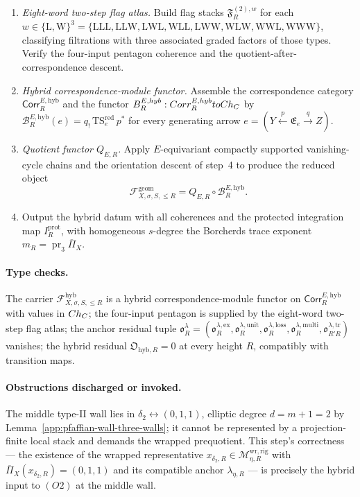 \begin{enumerate}
\item \emph{Eight-word two-step flag atlas.}  Build flag stacks
\(\mathfrak F^{(2),w}_R\) for each
\(w\in\{\mathrm L,\mathrm W\}^3=
\{\mathrm{LLL},\mathrm{LLW},\mathrm{LWL},\mathrm{WLL},\mathrm{LWW},
\mathrm{WLW},\mathrm{WWL},\mathrm{WWW}\}\), classifying filtrations
with three associated graded factors of those types.  Verify the
four-input pentagon coherence and the quotient-after-correspondence
descent.

\item \emph{Hybrid correspondence-module functor.}  Assemble the
correspondence category
\(\mathsf{Corr}^{E,\mathrm{hyb}}_R\) and the functor
\(B_R^{E,hyb}:Corr^{E,hyb}_R
toCh_{C}\) by
\(\mathcal B_R^{E,\mathrm{hyb}}(e)=q_!\,\mathrm{TS}^{\mathrm{red}}_e\,p^*\)
for every generating arrow
\(e=(Y\xleftarrow{p}\mathfrak E_e\xrightarrow{q}Z)\).

\item \emph{Quotient functor \(Q_{E,R}\).}  Apply
\(E\)-equivariant compactly supported vanishing-cycle chains and the
orientation descent of step~4 to produce the reduced object
\[
\mathcal F^{\mathrm{geom}}_{X,\sigma,S,\le R}
=Q_{E,R}\circ\mathcal B_R^{E,\mathrm{hyb}}.
\]

\item Output the hybrid datum with all coherences and the protected
integration map \(I_R^{\mathrm{prot}}\), with homogeneous
\(s\)-degree the Borcherds trace exponent
\(m_R=\operatorname{pr}_3\overline\Pi_X\).
\end{enumerate}

\paragraph{Type checks.}
The carrier
\(\mathcal F_{X,\sigma,S,\le R}^{\mathrm{hyb}}\) is a hybrid
correspondence-module functor on
\(\mathsf{Corr}^{E,\mathrm{hyb}}_R\) with values in
\(Ch_{C}\); the four-input pentagon is supplied by
the eight-word two-step flag atlas; the anchor residual tuple
\(\mathfrak o^\lambda_R=
(\mathfrak o^{\lambda,\mathrm{ex}}_R,
\mathfrak o^{\lambda,\mathrm{unit}}_R,
\mathfrak o^{\lambda,\mathrm{loss}}_R,
\mathfrak o^{\lambda,\mathrm{multi}}_R,
\mathfrak o^{\lambda,\mathrm{tr}}_{R'R})\) vanishes; the hybrid
residual \(\mathfrak O_{\mathrm{hyb},R}=0\) at every height \(R\),
compatibly with transition maps.

\paragraph{Obstructions discharged or invoked.}
The middle type-II wall lies in
\(\delta_2\leftrightarrow(0,1,1)\), elliptic degree
\(d=m+1=2\) by Lemma~\ref{app:pfaffian-wall-three-walls}; it
cannot be represented by a projection-finite local stack and demands
the wrapped prequotient.  This step's correctness — the existence of
the wrapped representative
\(x_{\delta_2,R}\in\mathcal M_{\eta,R}^{\mathrm{wr,rig}}\) with
\(\overline\Pi_X(x_{\delta_2,R})=(0,1,1)\) and its compatible anchor
\(\lambda_{\eta,R}\) — is precisely the hybrid input to \((O2)\) at
the middle wall.

